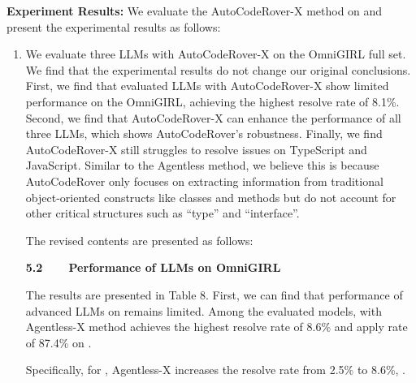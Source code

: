 \documentclass[12pt,american]{article}
\begin{document}
\begin{revresponse}
\begin{changes}
\end{changes}

\textbf{Experiment Results:} We evaluate the AutoCodeRover-X method on \Swebenchx and present the experimental results as follows:



\begin{enumerate}

\item We evaluate three LLMs with AutoCodeRover-X on the OmniGIRL full set. We find that the experimental results do not change our original conclusions. First, we find that evaluated LLMs with AutoCodeRover-X show limited performance on the OmniGIRL, achieving the highest resolve rate of 8.1\%. Second, we find that AutoCodeRover-X can enhance the performance of all three LLMs, which shows AutoCodeRover's robustness. Finally, we find AutoCodeRover-X still struggles to resolve issues on TypeScript and JavaScript. Similar to the Agentless method, we believe this is because AutoCodeRover only focuses on extracting information from traditional
object-oriented constructs like classes and methods but do not account for other critical structures such as ``type'' and ``interface''.

The revised contents are presented as follows:

\begin{changes}
\textbf{5.2~~~~Performance of LLMs on OmniGIRL}

  The results are presented in Table 8. First, we can find that  performance of advanced LLMs on \Swebenchx remains limited. Among the evaluated models, \GPT with Agentless-X method achieves the highest resolve rate of 8.6\% and apply rate of 87.4\% on \Swebenchx. 
 

 Specifically, for \GPT, Agentless-X increases the resolve rate from 2.5\% to 8.6\%, . 
 


\end{changes}
\end{enumerate}
\end{revresponse}
\end{document}
